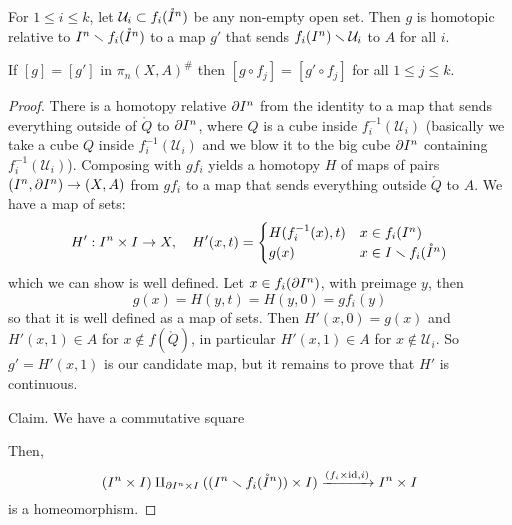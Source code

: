 \begin{lemma}\label{lemma:technical-lemma-for-HAT}
For $1\leq i\leq k$, let $\mathcal{U}_i\subset f_i(\mathring I^n)$ be any non-empty open set. Then $g$ is homotopic relative to $I^n\smallsetminus f_i(\mathring{I}^n)$ to a map $g'$ that sends $f_i(I^n)\smallsetminus\mathcal{U}_i$ to $A$ for all $i$.\alvaropls{}
\end{lemma}

\begin{remark}
If $[g]=[g']$ in $\pi_n(X,A)^\#$ then $[g\circ f_j]=[g'\circ f_j]$ for all $1\leq j\leq k$.
\end{remark}

\begin{proof}
There is a homotopy relative $\partial I^n$ from the identity to a map that sends everything outside of $\ring Q$ to $\partial I^n$, where $Q$ is a cube inside $f^{-1}_i(\mathcal{U}_i)$ (basically we take a cube $Q$ inside $f^{-1}_i(\mathcal{U}_i)$ and we blow it to the big cube $\partial I^n$ containing $f^{-1}_i(\mathcal{U}_i)$). Composing with $gf_i$ yields a homotopy $H$ of maps of pairs $(I^n,\partial I^n)\to(X,A)$ from $gf_i$ to a map that sends everything outside $\ring Q$ to $A$. We have a map of sets:
\[H':I^n\times I\to X,\quad H'(x,t)=\begin{cases}H(f_i^{-1}(x),t) & x\in f_i(I^n) \\ g(x) & x\in I\smallsetminus f_i(\mathring{I}^n)\end{cases}\]
which we can show is well defined. Let $x\in f_i(\partial I^n)$, with preimage $y$, then
\[g(x)=H(y,t)=H(y,0)=gf_i(y)\] so that it is well defined as a map of sets. Then $H'(x,0)=g(x)$ and $H'(x,1)\in A$ for $x\not\in f(\mathring{Q})$, in particular $H'(x,1)\in A$ for $x\not\in\mathcal{U}_i$. So $g'=H'(x,1)$ is our candidate map, but it remains to prove that $H'$ is continuous.

Claim. We have a commutative square
\begin{center}
\end{center}
Then,
\[(I^n\times I)\amalg_{\partial I^n\times I} ((I^n\smallsetminus f_i(\mathring{I}^n))\times I)\xrightarrow{(f_i\times\operatorname{id},i)} I^n\times I\]
is a homeomorphism.


\end{proof}
